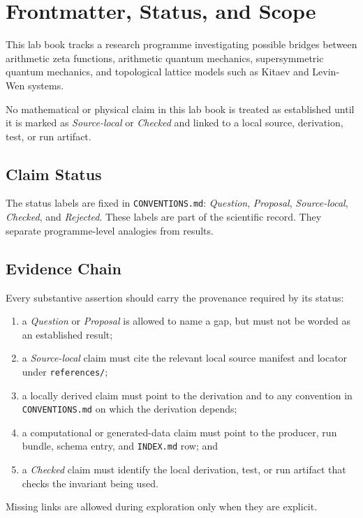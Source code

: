 
\section{Frontmatter, Status, and Scope}

This lab book tracks a research programme investigating possible bridges
between arithmetic zeta functions, arithmetic quantum mechanics,
supersymmetric quantum mechanics, and topological lattice models such as
Kitaev and Levin-Wen systems.

No mathematical or physical claim in this lab book is treated as established
until it is marked as \emph{Source-local} or \emph{Checked} and linked to a
local source, derivation, test, or run artifact.

\subsection{Claim Status}

The status labels are fixed in \texttt{CONVENTIONS.md}:
\emph{Question}, \emph{Proposal}, \emph{Source-local}, \emph{Checked}, and
\emph{Rejected}. These labels are part of the scientific record. They separate
programme-level analogies from results.

\subsection{Evidence Chain}

Every substantive assertion should carry the provenance required by its status:

\begin{enumerate}
  \item a \emph{Question} or \emph{Proposal} is allowed to name a gap, but must
  not be worded as an established result;
  \item a \emph{Source-local} claim must cite the relevant local source
  manifest and locator under \texttt{references/};
  \item a locally derived claim must point to the derivation and to any
  convention in \texttt{CONVENTIONS.md} on which the derivation depends;
  \item a computational or generated-data claim must point to the producer,
  run bundle, schema entry, and \texttt{INDEX.md} row; and
  \item a \emph{Checked} claim must identify the local derivation, test, or run
  artifact that checks the invariant being used.
\end{enumerate}

Missing links are allowed during exploration only when they are explicit.
